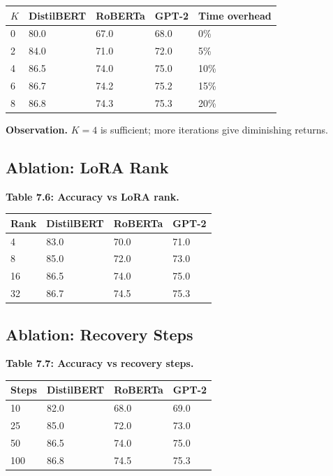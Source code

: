 \begin{table}[H]
\centering
\small
\begin{tabular}{lllll}
\toprule
\textbf{$K$} & \textbf{DistilBERT} & \textbf{RoBERTa} & \textbf{GPT-2} & \textbf{Time overhead} \\
\midrule
0 & 80.0 & 67.0 & 68.0 & 0\% \\
2 & 84.0 & 71.0 & 72.0 & 5\% \\
4 & 86.5 & 74.0 & 75.0 & 10\% \\
6 & 86.7 & 74.2 & 75.2 & 15\% \\
8 & 86.8 & 74.3 & 75.3 & 20\% \\
\bottomrule
\end{tabular}
\end{table}

\textbf{Observation.} $K = 4$ is sufficient; more iterations give diminishing returns.

\subsection{Ablation: LoRA Rank}

\textbf{Table 7.6: Accuracy vs LoRA rank.}

\begin{table}[H]
\centering
\small
\begin{tabular}{llll}
\toprule
\textbf{Rank} & \textbf{DistilBERT} & \textbf{RoBERTa} & \textbf{GPT-2} \\
\midrule
4 & 83.0 & 70.0 & 71.0 \\
8 & 85.0 & 72.0 & 73.0 \\
16 & 86.5 & 74.0 & 75.0 \\
32 & 86.7 & 74.5 & 75.3 \\
\bottomrule
\end{tabular}
\end{table}

\subsection{Ablation: Recovery Steps}

\textbf{Table 7.7: Accuracy vs recovery steps.}

\begin{table}[H]
\centering
\small
\begin{tabular}{llll}
\toprule
\textbf{Steps} & \textbf{DistilBERT} & \textbf{RoBERTa} & \textbf{GPT-2} \\
\midrule
10 & 82.0 & 68.0 & 69.0 \\
25 & 85.0 & 72.0 & 73.0 \\
50 & 86.5 & 74.0 & 75.0 \\
100 & 86.8 & 74.5 & 75.3 \\
\bottomrule
\end{tabular}
\end{table}

